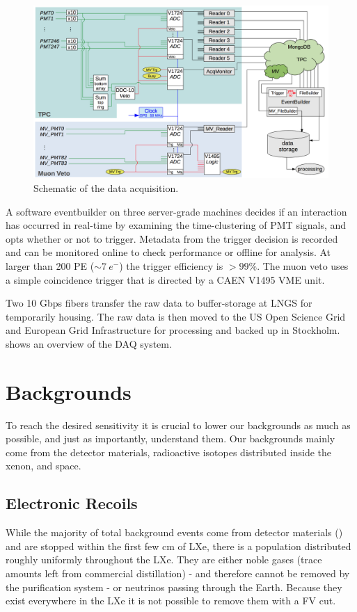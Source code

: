 \begin{figure}
\centering
\includegraphics[width=\textwidth]{DAQ}
\caption{Schematic of the data acquisition.}
\label{fig:xenon1t_daq_schematic}
\end{figure}

A software eventbuilder on three server-grade machines decides if an interaction has occurred in real-time by examining the
time-clustering of PMT signals, and opts whether or not to trigger.  Metadata from the trigger decision is recorded and can be monitored
online to check performance or offline for analysis.  At larger than 200 PE (${\sim}7\ e^-$) the trigger efficiency is $> 99\%$.  The muon
veto uses a simple coincidence trigger that is directed by a CAEN V1495 VME unit.

Two 10 Gbps fibers transfer the raw data to buffer-storage at LNGS for temporarily housing.  The raw data is then moved to the US Open
Science Grid and European Grid Infrastructure for processing and backed up in Stockholm.   shows an
overview of the DAQ system.



\section{Backgrounds}
\label{sec:backgrounds}
To reach the desired sensitivity it is crucial to lower our backgrounds as much as possible, and just as importantly, understand
them.  Our backgrounds mainly come from the detector materials, radioactive isotopes distributed inside the xenon, and space.



\subsection{Electronic Recoils}
\label{subsec:backgrounds_electronic}
While the majority of total background events come from detector materials () and are stopped
within the first few cm of LXe, there is a population distributed roughly uniformly throughout the LXe.  They are either noble gases (trace
amounts left from commercial distillation) - and therefore cannot be removed by the purification system - or neutrinos passing through the
Earth.  Because they exist everywhere in the LXe it is not possible to remove them with a FV cut.



